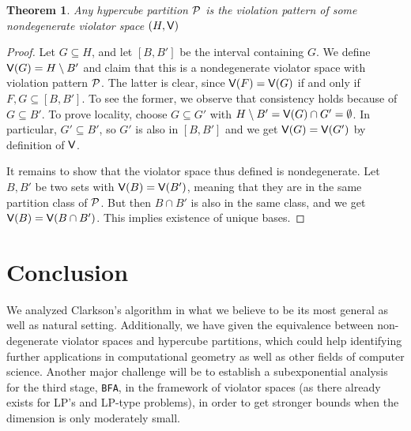 \documentclass[12pt]{article}
\def\Violators{{\sf V}}
\newtheorem{theorem2}{Theorem}[section]
\newenvironment{theorem}{\begin{theorem2}}{\end{theorem2}}
\theoremstyle{remark}
\def\stageIII{\texttt{BFA}}
\begin{document}
\begin{theorem}
Any hypercube partition ${\cal P}$ is the violation pattern
of some nondegenerate violator space $(H,\Violators)$
 \end{theorem}
\begin{proof}
Let $G\subseteq H$, and let $[B,B']$ be the interval containing
$G$. We define $\Violators(G)=H\setminus B'$ and claim that this is a
nondegenerate violator space with violation pattern ${\cal P}$. The
latter is clear, since $\Violators(F)=\Violators(G)$ if and only if $F,G\subseteq
[B,B']$. To see the former, we observe that consistency holds because
of $G\subseteq B'$. To prove locality, choose $G\subseteq G'$ with
$H\setminus B'=\Violators(G)\cap G'=\emptyset$. In particular, $G'\subseteq
B'$, so $G'$ is also in $[B,B']$ and we get $\Violators(G)=\Violators(G')$ by definition
of $\Violators$.

It remains to show that the violator space thus defined is nondegenerate.
Let $B,B'$ be two sets with $\Violators(B)=\Violators(B')$, meaning that they are in the
same partition class of ${\cal P}$. But then $B\cap B'$ is also in the
same class, and we get $\Violators(B)=\Violators(B\cap B')$. This implies existence of
unique bases.
\end{proof}

\section{Conclusion}
We analyzed Clarkson's algorithm
in what we believe to be its most general as well as natural
setting. Additionally, we have given the equivalence between non-degenerate violator
spaces and hypercube partitions, which could help 
identifying further applications in computational geometry as well as other fields
of computer science. Another major challenge will be to establish
a subexponential analysis for the third stage, \stageIII, in the framework of violator spaces
(as there already exists for LP's and LP-type problems), in order
to get stronger bounds when the dimension is only moderately small.
\end{document}
